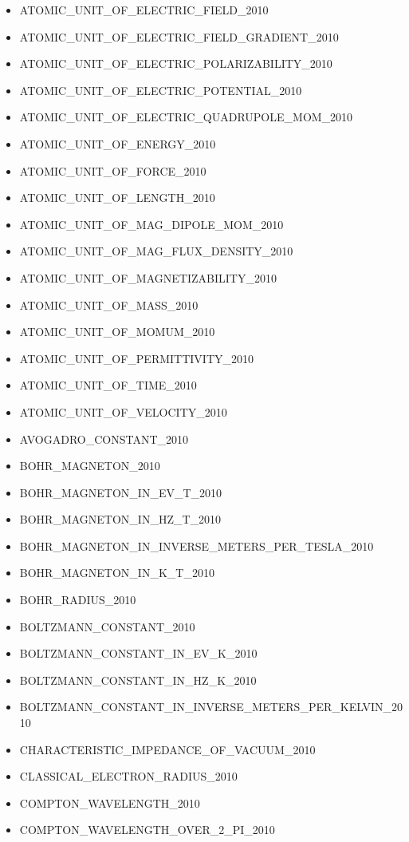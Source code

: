\begin{itemize}
\item
  ATOMIC\_UNIT\_OF\_ELECTRIC\_FIELD\_2010
\item
  ATOMIC\_UNIT\_OF\_ELECTRIC\_FIELD\_GRADIENT\_2010
\item
  ATOMIC\_UNIT\_OF\_ELECTRIC\_POLARIZABILITY\_2010
\item
  ATOMIC\_UNIT\_OF\_ELECTRIC\_POTENTIAL\_2010
\item
  ATOMIC\_UNIT\_OF\_ELECTRIC\_QUADRUPOLE\_MOM\_2010
\item
  ATOMIC\_UNIT\_OF\_ENERGY\_2010
\item
  ATOMIC\_UNIT\_OF\_FORCE\_2010
\item
  ATOMIC\_UNIT\_OF\_LENGTH\_2010
\item
  ATOMIC\_UNIT\_OF\_MAG\_DIPOLE\_MOM\_2010
\item
  ATOMIC\_UNIT\_OF\_MAG\_FLUX\_DENSITY\_2010
\item
  ATOMIC\_UNIT\_OF\_MAGNETIZABILITY\_2010
\item
  ATOMIC\_UNIT\_OF\_MASS\_2010
\item
  ATOMIC\_UNIT\_OF\_MOMUM\_2010
\item
  ATOMIC\_UNIT\_OF\_PERMITTIVITY\_2010
\item
  ATOMIC\_UNIT\_OF\_TIME\_2010
\item
  ATOMIC\_UNIT\_OF\_VELOCITY\_2010
\item
  AVOGADRO\_CONSTANT\_2010
\item
  BOHR\_MAGNETON\_2010
\item
  BOHR\_MAGNETON\_IN\_EV\_T\_2010
\item
  BOHR\_MAGNETON\_IN\_HZ\_T\_2010
\item
  BOHR\_MAGNETON\_IN\_INVERSE\_METERS\_PER\_TESLA\_2010
\item
  BOHR\_MAGNETON\_IN\_K\_T\_2010
\item
  BOHR\_RADIUS\_2010
\item
  BOLTZMANN\_CONSTANT\_2010
\item
  BOLTZMANN\_CONSTANT\_IN\_EV\_K\_2010
\item
  BOLTZMANN\_CONSTANT\_IN\_HZ\_K\_2010
\item
  BOLTZMANN\_CONSTANT\_IN\_INVERSE\_METERS\_PER\_KELVIN\_2010
\item
  CHARACTERISTIC\_IMPEDANCE\_OF\_VACUUM\_2010
\item
  CLASSICAL\_ELECTRON\_RADIUS\_2010
\item
  COMPTON\_WAVELENGTH\_2010
\item
  COMPTON\_WAVELENGTH\_OVER\_2\_PI\_2010

\end{itemize}
